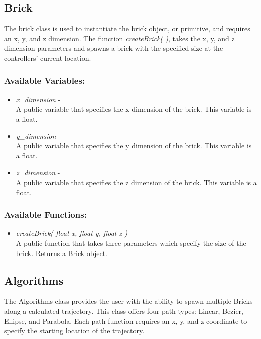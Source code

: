 \documentclass[draftclsnofoot,onecolumn,compsoc]{IEEEtran}
\begin{document}
\subsection{Brick}
The brick class is used to instantiate the brick object, or primitive, and requires an x, y, and z dimension. The function \textit{createBrick( )}, takes the x, y, and z dimension parameters and spawns a brick with the specified size at the controllers' current location. 

\subsubsection{Available Variables:}
\begin{itemize}
\item \textit{x\_dimension} - \\
A public variable that specifies the x dimension of the brick. This variable is a float.
\item \textit{y\_dimension} - \\
A public variable that specifies the y dimension of the brick. This variable is a float.
\item \textit{z\_dimension} - \\
A public variable that specifies the z dimension of the brick. This variable is a float.
\end{itemize}

\subsubsection{Available Functions:}
\begin{itemize}
\item \textit{createBrick( float x, float y, float z )} -\\
A public function that takes three parameters which specify the size of the brick. Returns a Brick object.
\end{itemize}

\subsection{Algorithms}
The Algorithms class provides the user with the ability to spawn multiple Bricks along a calculated trajectory. This class offers four path types: Linear, Bezier, Ellipse, and Parabola. Each path function requires an x, y, and z coordinate to specify the starting location of the trajectory. 
\end{document}
